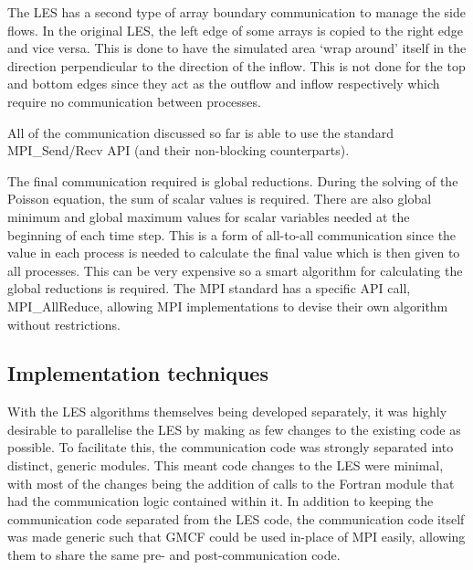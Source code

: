 The LES has a second type of array boundary communication to manage the side
flows. In the original LES, the left edge of some arrays is copied to the right
edge and vice versa. This is done to have the simulated area `wrap around'
itself in the direction perpendicular to the direction of the inflow. This is
not done for the top and bottom edges since they act as the outflow and inflow
respectively which require no communication between processes.

All of the communication discussed so far is able to use the standard
MPI\_Send/Recv API (and their non-blocking counterparts).

The final communication required is global reductions. During the solving of the
Poisson equation, the sum of scalar values is required. There are also global
minimum and global maximum values for scalar variables needed at the beginning
of each time step. This is a form of all-to-all communication since the value in
each process is needed to calculate the final value which is then given to all
processes. This can be very expensive so a smart algorithm for calculating the
global reductions is required. The MPI standard has a specific API call,
MPI\_AllReduce, allowing MPI implementations to devise their own algorithm
without restrictions.

\subsection{Implementation techniques}

With the LES algorithms themselves being developed separately, it was highly
desirable to parallelise the LES by making as few changes to the existing code
as possible. To facilitate this, the communication code was strongly separated
into distinct, generic modules. This meant code changes to the LES were minimal,
with most of the changes being the addition of calls to the Fortran module that
had the communication logic contained within it. In addition to keeping the
communication code separated from the LES code, the communication code itself
was made generic such that GMCF could be used in-place of MPI easily, allowing
them to share the same pre- and post-communication code.
